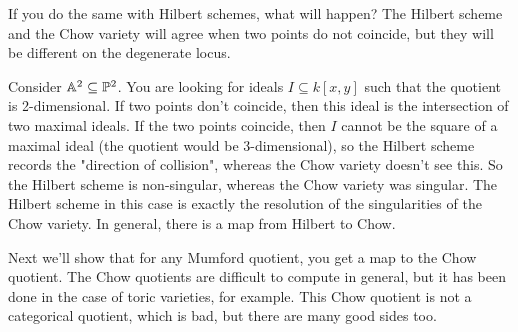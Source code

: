If you do the same with Hilbert schemes, what will happen? The Hilbert scheme and the Chow variety will agree when two points do not coincide, but they will be different on the degenerate locus.

Consider $\mathbb{A}^2\subseteq \mathbb{P}^2$. You are looking for ideals $I\subseteq k[x,y]$ such that the quotient is 2-dimensional. If two points don't coincide, then this ideal is the intersection of two maximal ideals. If the two points coincide, then $I$ cannot be the square of a maximal ideal (the quotient would be 3-dimensional), so the Hilbert scheme records the "direction of collision", whereas the Chow variety doesn't see this. So the Hilbert scheme is non-singular, whereas the Chow variety was singular. The Hilbert scheme in this case is exactly the resolution of the singularities of the Chow variety. In general, there is a map from Hilbert to Chow.

Next we'll show that for any Mumford quotient, you get a map to the Chow quotient. The Chow quotients are difficult to compute in general, but it has been done in the case of toric varieties, for example. This Chow quotient is not a categorical quotient, which is bad, but there are many good sides too.
